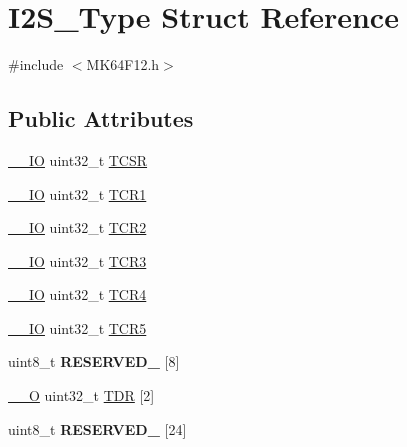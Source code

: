 \hypertarget{structI2S__Type}{}\section{I2\+S\+\_\+\+Type Struct Reference}
\label{structI2S__Type}


{\ttfamily \#include $<$M\+K64\+F12.\+h$>$}

\subsection*{Public Attributes}
\begin{DoxyCompactItemize}
\item 
\hyperlink{core__sc300_8h_aec43007d9998a0a0e01faede4133d6be}{\+\_\+\+\_\+\+IO} uint32\+\_\+t \hyperlink{structI2S__Type_ac267d105f56a5a51a2f96ca821c3e4a7}{T\+C\+SR}
\item 
\hyperlink{core__sc300_8h_aec43007d9998a0a0e01faede4133d6be}{\+\_\+\+\_\+\+IO} uint32\+\_\+t \hyperlink{structI2S__Type_a402dc49c093c976d36ae655ab62d0df5}{T\+C\+R1}
\item 
\hyperlink{core__sc300_8h_aec43007d9998a0a0e01faede4133d6be}{\+\_\+\+\_\+\+IO} uint32\+\_\+t \hyperlink{structI2S__Type_a4134a86cc4b66d8d7e59fed43bf833ca}{T\+C\+R2}
\item 
\hyperlink{core__sc300_8h_aec43007d9998a0a0e01faede4133d6be}{\+\_\+\+\_\+\+IO} uint32\+\_\+t \hyperlink{structI2S__Type_a3a79413b288cefdce2291865b42c6a31}{T\+C\+R3}
\item 
\hyperlink{core__sc300_8h_aec43007d9998a0a0e01faede4133d6be}{\+\_\+\+\_\+\+IO} uint32\+\_\+t \hyperlink{structI2S__Type_ae01402cc631b47ce8128465aa287e6df}{T\+C\+R4}
\item 
\hyperlink{core__sc300_8h_aec43007d9998a0a0e01faede4133d6be}{\+\_\+\+\_\+\+IO} uint32\+\_\+t \hyperlink{structI2S__Type_a91337041fca47b36ff4f31f29cb273bf}{T\+C\+R5}
\item 
uint8\+\_\+t {\bfseries R\+E\+S\+E\+R\+V\+E\+D\+\_} \mbox{[}8\mbox{]}\hypertarget{structI2S__Type_ad713dce758110b61ace024a52f230133}{}\label{structI2S__Type_ad713dce758110b61ace024a52f230133}

\item 
\hyperlink{core__sc300_8h_a7e25d9380f9ef903923964322e71f2f6}{\+\_\+\+\_\+O} uint32\+\_\+t \hyperlink{structI2S__Type_aa64a72681c17030d8003eff7fa2b1bd4}{T\+DR} \mbox{[}2\mbox{]}
\item 
uint8\+\_\+t {\bfseries R\+E\+S\+E\+R\+V\+E\+D\+\_} \mbox{[}24\mbox{]}\hypertarget{structI2S__Type_a4f67ea7a8abcd37b3c740a3aa8b8fd22}{}\label{structI2S__Type_a4f67ea7a8abcd37b3c740a3aa8b8fd22}


\end{DoxyCompactItemize}
